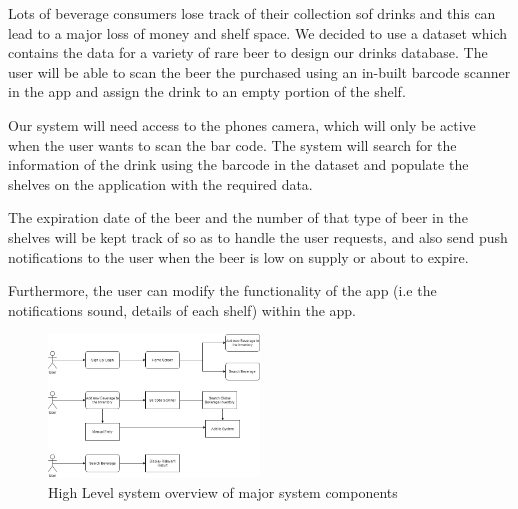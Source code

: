 Lots of beverage consumers lose track of their collection sof drinks and this can lead to a major loss of money and shelf space. We 
decided to use a dataset which contains the data for a variety of rare beer to design our drinks database. The user will 
be able to scan the beer the purchased using an in-built barcode scanner in the app and assign the drink to an empty 
portion of the shelf.  

    Our system will need access to the phones camera, which will only be active when the user wants to scan the bar code.
The system will search for the information of the drink using the barcode in the dataset and populate the shelves on the application with the required data.

    The expiration date of the beer and the number of that type of beer in the shelves will be kept track of so as to handle the user requests, and also 
send push notifications to the user when the beer is low on supply or about to expire.

    Furthermore, the user can modify the functionality of the app (i.e the notifications sound, details of each shelf) within the app.

\begin{figure}[ht]
    \centering
    \includegraphics[width=0.5\textwidth]{images/systemoverview}
    \caption{High Level system overview of major system components}
\end{figure}
